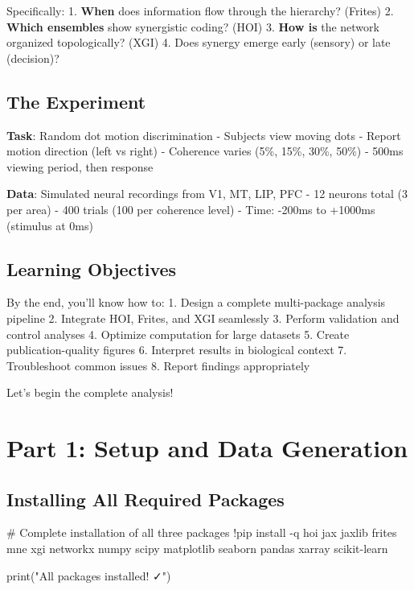\documentclass[
  11pt,
  letterpaper,
  oneside,
  openany]{book}
\newenvironment{Shaded}{\begin{snugshade}}{\end{snugshade}}
\newcommand{\BuiltInTok}[1]{\textcolor[rgb]{0.00,0.23,0.31}{#1}}
\newcommand{\CommentTok}[1]{\textcolor[rgb]{0.37,0.37,0.37}{#1}}
\newcommand{\NormalTok}[1]{\textcolor[rgb]{0.00,0.23,0.31}{#1}}
\newcommand{\OperatorTok}[1]{\textcolor[rgb]{0.37,0.37,0.37}{#1}}
\newcommand{\StringTok}[1]{\textcolor[rgb]{0.13,0.47,0.30}{#1}}
\begin{document}
Specifically: 1. \textbf{When} does information flow through the
hierarchy? (Frites) 2. \textbf{Which ensembles} show synergistic coding?
(HOI) 3. \textbf{How is} the network organized topologically? (XGI) 4.
Does synergy emerge early (sensory) or late (decision)?

\subsection{The Experiment}\label{the-experiment}

\textbf{Task}: Random dot motion discrimination - Subjects view moving
dots - Report motion direction (left vs right) - Coherence varies (5\%,
15\%, 30\%, 50\%) - 500ms viewing period, then response

\textbf{Data}: Simulated neural recordings from V1, MT, LIP, PFC - 12
neurons total (3 per area) - 400 trials (100 per coherence level) -
Time: -200ms to +1000ms (stimulus at 0ms)

\subsection{Learning Objectives}\label{learning-objectives-4}

By the end, you'll know how to: 1. Design a complete multi-package
analysis pipeline 2. Integrate HOI, Frites, and XGI seamlessly 3.
Perform validation and control analyses 4. Optimize computation for
large datasets 5. Create publication-quality figures 6. Interpret
results in biological context 7. Troubleshoot common issues 8. Report
findings appropriately

Let's begin the complete analysis! 🧠🔬

\section{Part 1: Setup and Data
Generation}\label{part-1-setup-and-data-generation}

\subsection{Installing All Required
Packages}\label{installing-all-required-packages}

\begin{Shaded}
\begin{Highlighting}[]
\CommentTok{\# Complete installation of all three packages}
\OperatorTok{!}\NormalTok{pip install }\OperatorTok{{-}}\NormalTok{q hoi jax jaxlib frites mne xgi networkx numpy scipy matplotlib seaborn pandas xarray scikit}\OperatorTok{{-}}\NormalTok{learn}

\BuiltInTok{print}\NormalTok{(}\StringTok{"All packages installed! ✓"}\NormalTok{)}
\end{Highlighting}
\end{Shaded}
\end{document}
